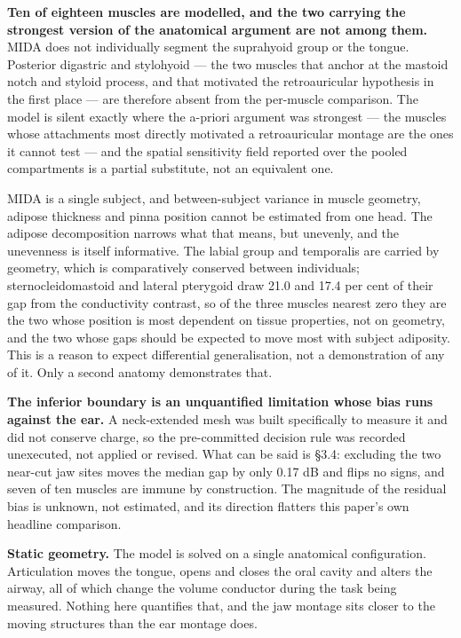 \documentclass[
  11pt,
  a4paper,
]{article}
\begin{document}
\textbf{Ten of eighteen muscles are modelled, and the two carrying the strongest
version of the anatomical argument are not among them.} MIDA does not
individually segment the suprahyoid group or the tongue. Posterior digastric and
stylohyoid --- the two muscles that anchor at the mastoid notch and styloid
process, and that motivated the retroauricular hypothesis in the first place ---
are therefore absent from the per-muscle comparison. The model is silent exactly
where the a-priori argument was strongest --- the muscles whose attachments most
directly motivated a retroauricular montage are the ones it cannot test --- and
the spatial sensitivity field reported over the pooled compartments is a partial
substitute, not an equivalent one.

MIDA is a single subject, and between-subject variance in muscle geometry,
adipose thickness and pinna position cannot be estimated from one head. The
adipose decomposition narrows what that means, but unevenly, and the unevenness
is itself informative. The labial group and temporalis are carried by geometry,
which is comparatively conserved between individuals; sternocleidomastoid and
lateral pterygoid draw 21.0 and 17.4 per cent of their gap from the conductivity
contrast, so of the three muscles nearest zero they are the two whose position
is most dependent on tissue properties, not on geometry, and the two whose gaps
should be expected to move most with subject adiposity. This is a reason to
expect differential generalisation, not a demonstration of any of it. Only a
second anatomy demonstrates that.

\textbf{The inferior boundary is an unquantified limitation whose bias runs against
the ear.} A neck-extended mesh was built specifically to measure it and did not
conserve charge, so the pre-committed decision rule was recorded unexecuted, not
applied or revised. What can be said is §3.4: excluding the two near-cut jaw
sites moves the median gap by only \textminus{}0.17 dB and flips no signs, and seven of ten
muscles are immune by construction. The magnitude of the residual bias is
unknown, not estimated, and its direction flatters this paper's own headline
comparison.

\textbf{Static geometry.} The model is solved on a single anatomical configuration.
Articulation moves the tongue, opens and closes the oral cavity and alters the
airway, all of which change the volume conductor during the task being measured.
Nothing here quantifies that, and the jaw montage sits closer to the moving
structures than the ear montage does.
\end{document}
